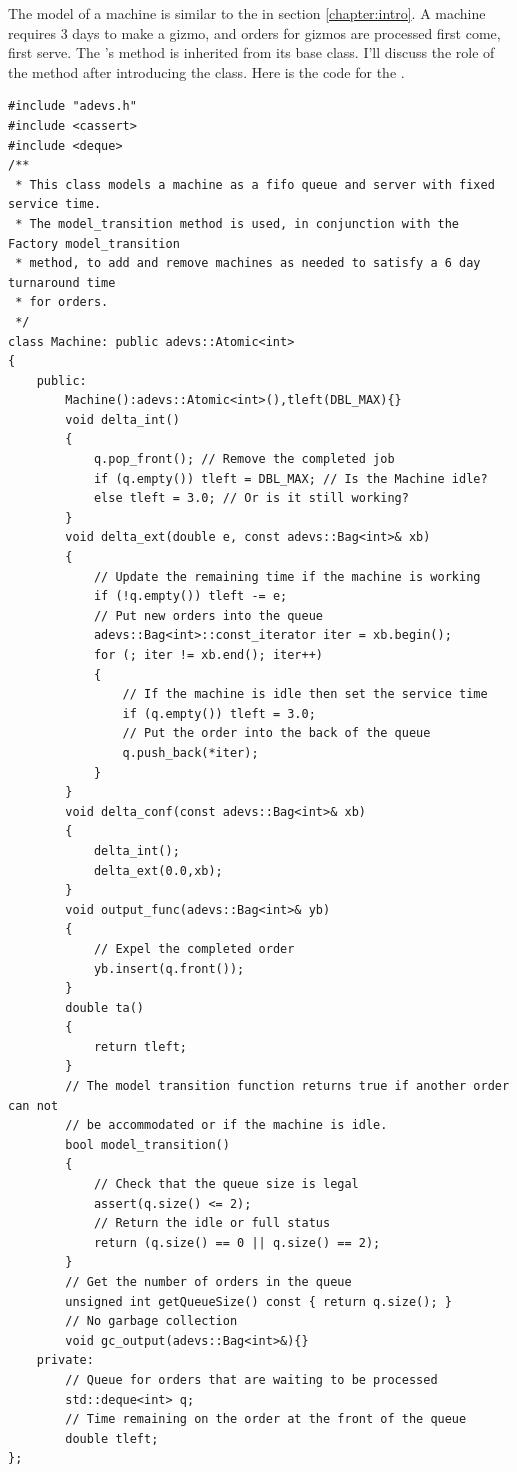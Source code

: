 The model of a machine is similar to the  in section \ref{chapter:intro}. A machine requires 3 days to make a gizmo, and orders for gizmos are processed first come, first serve. The 's  method is inherited from its  base class. I'll discuss the role of the  method after introducing the  class. Here is the code for the .
\begin{verbatim}
#include "adevs.h"
#include <cassert>
#include <deque>
/**
 * This class models a machine as a fifo queue and server with fixed service time.
 * The model_transition method is used, in conjunction with the Factory model_transition
 * method, to add and remove machines as needed to satisfy a 6 day turnaround time
 * for orders. 
 */
class Machine: public adevs::Atomic<int> 
{
    public:
        Machine():adevs::Atomic<int>(),tleft(DBL_MAX){}
        void delta_int()
        {
            q.pop_front(); // Remove the completed job
            if (q.empty()) tleft = DBL_MAX; // Is the Machine idle?
            else tleft = 3.0; // Or is it still working?
        }
        void delta_ext(double e, const adevs::Bag<int>& xb)
        {
            // Update the remaining time if the machine is working
            if (!q.empty()) tleft -= e;
            // Put new orders into the queue
            adevs::Bag<int>::const_iterator iter = xb.begin();
            for (; iter != xb.end(); iter++) 
            {
                // If the machine is idle then set the service time
                if (q.empty()) tleft = 3.0;
                // Put the order into the back of the queue
                q.push_back(*iter);
            }
        }
        void delta_conf(const adevs::Bag<int>& xb)
        {
            delta_int();
            delta_ext(0.0,xb);
        }
        void output_func(adevs::Bag<int>& yb)
        {
            // Expel the completed order
            yb.insert(q.front());
        }
        double ta()
        {
            return tleft;
        }
        // The model transition function returns true if another order can not
        // be accommodated or if the machine is idle.
        bool model_transition()
        {
            // Check that the queue size is legal
            assert(q.size() <= 2);
            // Return the idle or full status
            return (q.size() == 0 || q.size() == 2);
        }
        // Get the number of orders in the queue
        unsigned int getQueueSize() const { return q.size(); }
        // No garbage collection 
        void gc_output(adevs::Bag<int>&){}
    private:
        // Queue for orders that are waiting to be processed
        std::deque<int> q;
        // Time remaining on the order at the front of the queue
        double tleft; 
};
\end{verbatim}

